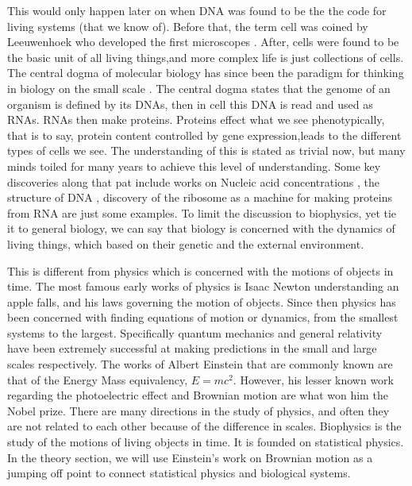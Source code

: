 \documentclass{article}
\begin{document}
This would only happen later on when DNA was found to be the the code for living systems (that we know of). Before that, the term cell was coined by Leeuwenhoek who developed the first microscopes . After, cells were found to be the basic unit of all living things,and more complex life is just collections of cells. The central dogma of molecular biology has since been the paradigm for thinking in biology on the small scale . The central dogma states that the genome of an organism is defined by its DNAs, then in cell this DNA is read and used as RNAs. RNAs then make proteins. Proteins effect what we see phenotypically, that is to say, protein content controlled by gene expression,leads to the different types of cells we see. The understanding of this is stated as trivial now, but many minds toiled for many years to achieve this level of understanding. Some key discoveries along that pat include works on Nucleic acid concentrations , the structure of DNA , discovery of the ribosome as a machine for making proteins from RNA are just some examples. To limit the discussion to biophysics, yet tie it to general biology, we can say that biology is concerned with the dynamics of living things, which based on their genetic and the external environment.

This is different from physics which is concerned with the motions of objects in time. The most famous early works of physics is Isaac Newton understanding an apple falls, and his laws governing the motion of objects. Since then physics has been concerned with finding equations of motion or dynamics, from the smallest systems to the largest. Specifically quantum mechanics and general relativity have been extremely successful at making predictions in the small and large scales respectively. The works of Albert Einstein that are commonly known are that of the Energy Mass equivalency, $E=mc^2$. However, his lesser known work regarding the photoelectric effect and Brownian motion are what won him the Nobel prize. There are many directions in the study of physics, and often they are not related to each other because of the difference in scales. Biophysics is the study of the motions of living objects in time. It is founded on statistical physics. In the theory section, we will use Einstein's work on Brownian motion as a jumping off point to connect statistical physics and biological systems.
\end{document}
